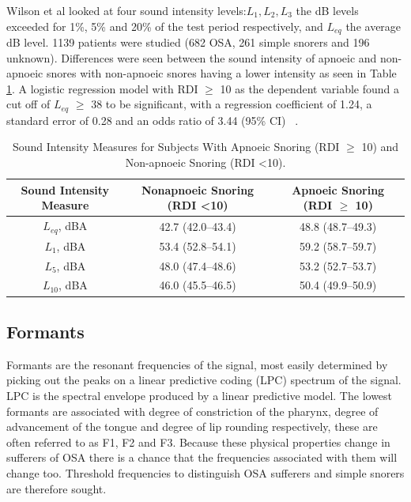 Wilson et al looked at four sound intensity levels:$ L_{1}, L_{2}, L_{3}$ the dB levels exceeded for 1\%, 5\% and 20\% of the test period respectively, and $L_{eq}$ the average dB level. 1139 patients were studied (682 OSA, 261 simple snorers and 196 unknown). Differences were seen between the sound intensity of apnoeic and non-apnoeic snores with non-apnoeic snores having a lower intensity as seen in Table \ref{table:wilson}. A logistic regression model with RDI $\geq$ 10 as the dependent variable found a cut off of $L_{eq}$ $\geq$ 38 to be significant, with a regression coefficient of 1.24, a standard error of 0.28 and an odds ratio of 3.44 (95\% CI) ~\cite{wilson1999snoring}.

\begin{table}[h]
\centering
\begin{tabular}{c c c}
\toprule
Sound Intensity Measure&Nonapnoeic Snoring (RDI \textless 10)&Apnoeic Snoring (RDI $\geq$ 10)\\ \midrule
$L_{eq}$, dBA&42.7 (42.0–43.4)&48.8 (48.7–49.3)\\ 
$L_{1}$, dBA&53.4 (52.8–54.1)&59.2 (58.7–59.7)\\ 
$L_{5}$, dBA&48.0 (47.4–48.6)&53.2 (52.7–53.7)\\ 
$L_{10}$, dBA&46.0 (45.5–46.5)&50.4 (49.9–50.9)\\ \bottomrule
\end{tabular}
\caption{Sound Intensity Measures for Subjects With Apnoeic Snoring (RDI $\geq$ 10) and Non-apnoeic Snoring (RDI \textless 10).}
\label{table:wilson}
\end{table}
\subsection{Formants}
Formants are the resonant frequencies of the signal, most easily determined by picking out the peaks on a linear predictive coding (LPC) spectrum of the signal. LPC is the spectral envelope produced by a linear predictive model. The lowest formants are associated with degree of constriction of the pharynx, degree of advancement of the tongue and degree of lip rounding respectively, these are often referred to as F1, F2 and F3. Because these physical properties change in sufferers of OSA there is a chance that the frequencies associated with them will change too. Threshold frequencies to distinguish OSA sufferers and simple snorers are therefore sought. 

